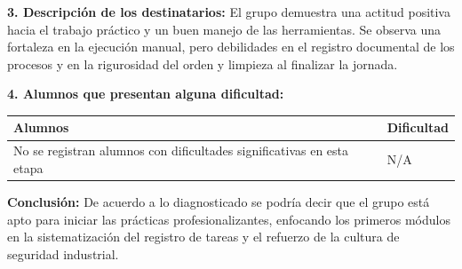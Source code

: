 \documentclass[11pt, a4paper]{article}
\begin{document}
\noindent \textbf{3. Descripción de los destinatarios:}
El grupo demuestra una actitud positiva hacia el trabajo práctico y un buen manejo de las herramientas. Se observa una fortaleza en la ejecución manual, pero debilidades en el registro documental de los procesos y en la rigurosidad del orden y limpieza al finalizar la jornada.

\noindent \textbf{4. Alumnos que presentan alguna dificultad:}

\begin{tabular}{|p{}|p{}|}
\hline
\rowcolor{gray!20} \textbf{Alumnos} & \textbf{Dificultad} \\
\hline
No se registran alumnos con dificultades significativas en esta etapa & N/A \\
\hline
\end{tabular}

\vspace{2em}

\noindent \textbf{Conclusión:}
De acuerdo a lo diagnosticado se podría decir que el grupo está apto para iniciar las prácticas profesionalizantes, enfocando los primeros módulos en la sistematización del registro de tareas y el refuerzo de la cultura de seguridad industrial.
\end{document}
